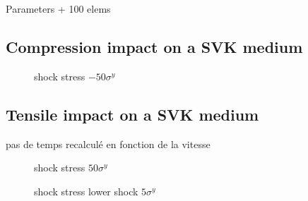 
Parameters + 100 elems


\subsection{Compression impact on a SVK medium}
\begin{figure}[h!]
  \centering
  {}
  {}
  \caption{shock stress $-50\sigma^y$}
  \label{fig:he_rarefaction}
\end{figure}
\subsection{Tensile impact on a SVK medium}
pas de temps recalculé en fonction de la vitesse
\begin{figure}[h!]
  \centering
  {}
  {}
  \caption{shock stress $50\sigma^y$}
  \label{fig:he_shock}
\end{figure}

\begin{figure}[h!]
  \centering
  {}
  {}
  \caption{shock stress lower shock $5\sigma^y$}
  \label{fig:he_low_shock}
\end{figure}

